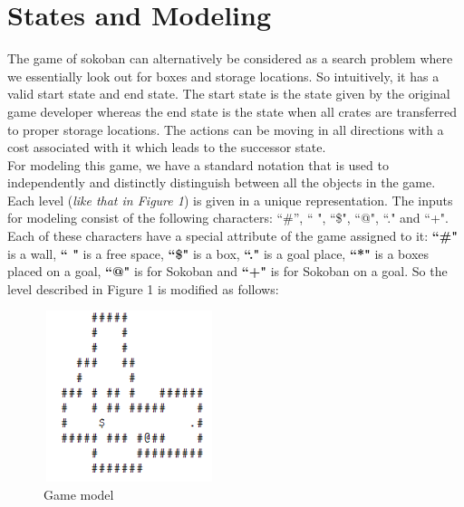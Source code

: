 \documentclass[10pt, final]{article}
\newcommand{\br}[1][.75]{\ \\[#1\baselineskip]}
\begin{document}
	\section{States and Modeling}
	The game of sokoban can alternatively be considered as a search problem where we essentially look out for boxes and storage locations. So intuitively, it has a valid start state and end state. The start state is the state given by the original game developer whereas the end state is the state when all crates are transferred to proper storage locations. The actions can be moving in all directions with a cost associated with it which leads to the successor state. \br
	For modeling this game, we have a standard notation that is used to independently and distinctly distinguish between all the objects in the game. Each level (\textit{like that in Figure 1}) is given in a unique representation. The inputs for modeling consist of the following characters: ``\#'', `` ", ``\$", ``@", ``." and ``+". Each of these characters have a special attribute of the game assigned to it: \textbf{``\#"} is a wall,  \textbf{`` "} is a free space, \textbf{``\$"} is a box, \textbf{``."} is a goal place,  \textbf{``*"} is a boxes placed on a goal, \textbf{``@"} is for Sokoban and \textbf{``+"} is for Sokoban on a goal. So the level described in Figure 1 is modified as follows:  \\
	\begin{figure}[h!]
		\centering
		\includegraphics[width=5cm, height=5cm]{pic4.png}
		\caption{Game model}
	\end{figure}
\end{document}
